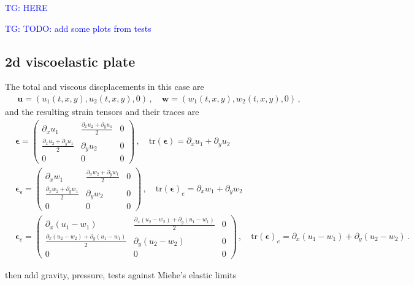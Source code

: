 \documentclass[11pt,a4paper]{article}
\newcommand{\p}{\partial}
\newcommand{\tg}[1]{\textcolor{blue}{TG: #1} }
\newcommand{\bb}[1]{\boldsymbol{#1}}
\newcommand{\varv}{\mathsf{v}}
\newcommand{\tr}{\text{tr}}
\begin{document}
\tg{HERE}

\tg{TODO: add some plots from tests}

\subsection{2d viscoelastic plate}

The total and viscous discplacements in this case are 
\begin{align*}
    \bb{u} = \left( u_1(t,x,y), u_2(t,x,y), 0\right)
    \,, \quad
    \bb{w} = \left( w_1(t,x,y), w_2(t,x,y), 0\right)
    \,,
\end{align*}
and the resulting strain tensors and their traces are
\begin{align*}
    &
    \bb{\epsilon} = 
    \begin{pmatrix}
        \p_x u_1 & \frac{\p_x u_2 + \p_y u_1}{2} & 0 \\
        \frac{\p_x u_2 + \p_y u_1}{2} & \p_y u_2 & 0 \\
        0 & 0 & 0 
    \end{pmatrix}
    \,, \quad
    \tr(\bb{\epsilon}) = \p_x u_1 + \p_y u_2
    \\
    &
    \bb{\epsilon}_\varv = 
    \begin{pmatrix}
        \p_x w_1 & \frac{\p_x w_2 + \p_y w_1}{2} & 0 \\
        \frac{\p_x w_2 + \p_y w_1}{2} & \p_y w_2 & 0 \\
        0 & 0 & 0 
    \end{pmatrix}
    \,, \quad
    \tr(\bb{\epsilon})_e = \p_x w_1 + \p_y w_2
    \\
    &
    \bb{\epsilon}_e = 
    \begin{pmatrix}
        \p_x (u_1 - w_1) & \frac{\p_x (u_2-w_2) + \p_y (u_1-w_1)}{2} & 0 \\
        \frac{\p_x (u_2-w_2) + \p_y (u_1-w_1)}{2} & \p_y (u_2-w_2) & 0 \\
        0 & 0 & 0 
    \end{pmatrix}
    \,, \quad
    \tr(\bb{\epsilon})_e = \p_x (u_1-w_1) + \p_y (u_2-w_2)
    \,.
\end{align*}

then add gravity, pressure, tests against Miehe's elastic limits

\end{document}
